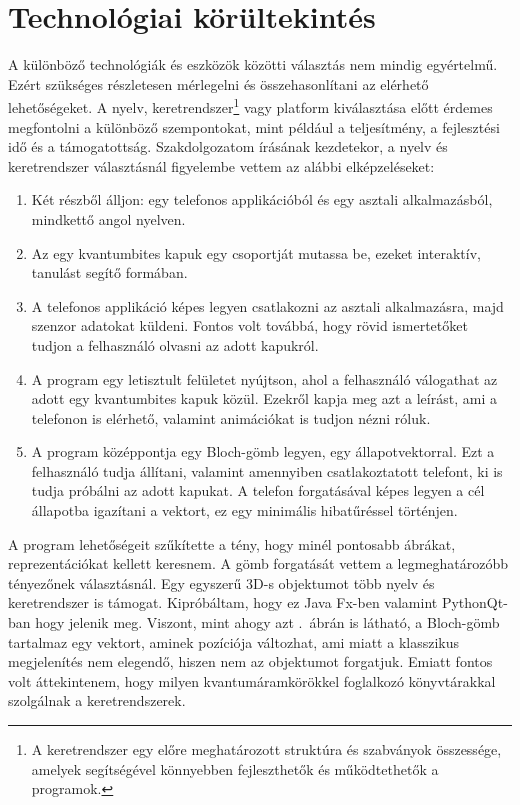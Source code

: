 \documentclass[
]{thesis-ekf}
\theoremstyle{definition}
\theoremstyle{remark}
\begin{document}
\section{Technológiai körültekintés}
A különböző technológiák és eszközök közötti választás nem mindig egyértelmű. Ezért szükséges részletesen mérlegelni és összehasonlítani az elérhető lehetőségeket. A nyelv, keretrendszer\footnote{A keretrendszer egy előre meghatározott struktúra és szabványok összessége, amelyek segítségével könnyebben fejleszthetők és működtethetők a programok.} vagy platform kiválasztása előtt érdemes megfontolni a különböző szempontokat, mint például a teljesítmény, a fejlesztési idő és a támogatottság. Szakdolgozatom írásának kezdetekor, a nyelv és keretrendszer választásnál figyelembe vettem az alábbi elképzeléseket:
\begin{enumerate}
	\item Két részből álljon: egy telefonos applikációból és egy asztali alkalmazásból, mindkettő angol nyelven.
	\item Az egy kvantumbites kapuk egy csoportját mutassa be, ezeket interaktív, tanulást segítő formában.
	\item A telefonos applikáció képes legyen csatlakozni az asztali alkalmazásra, majd szenzor adatokat küldeni. Fontos volt továbbá, hogy rövid ismertetőket tudjon a felhasználó olvasni az adott kapukról.
	\item A program egy letisztult felületet nyújtson, ahol a felhasználó válogathat az adott egy kvantumbites kapuk közül. Ezekről kapja meg azt a leírást, ami a telefonon is elérhető, valamint animációkat is tudjon nézni róluk.
	\item A program középpontja egy Bloch-gömb legyen, egy állapotvektorral. Ezt a felhasználó tudja állítani, valamint amennyiben csatlakoztatott telefont, ki is tudja próbálni az adott kapukat. A telefon forgatásával képes legyen a cél állapotba igazítani a vektort, ez egy minimális hibatűréssel történjen.
\end{enumerate}

A program lehetőségeit szűkítette a tény, hogy minél pontosabb ábrákat, reprezentációkat kellett keresnem. A gömb forgatását vettem a legmeghatározóbb tényezőnek választásnál. Egy egyszerű 3D-s objektumot több nyelv és keretrendszer is támogat. Kipróbáltam, hogy ez Java Fx-ben valamint  PythonQt-ban hogy jelenik meg. Viszont, mint ahogy azt \az{\ref{fig:bitqubit}}.~ábrán is látható, a Bloch-gömb tartalmaz egy vektort, aminek pozíciója változhat, ami miatt a klasszikus megjelenítés nem elegendő, hiszen nem az objektumot forgatjuk. Emiatt fontos volt áttekintenem, hogy milyen kvantumáramkörökkel foglalkozó könyvtárakkal szolgálnak a keretrendszerek.
\end{document}
